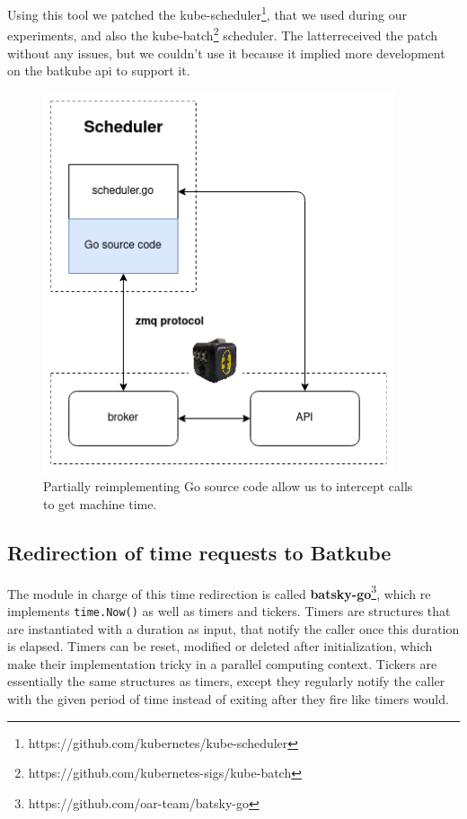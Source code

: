 Using this tool we patched the
kube-scheduler\footnote{https://github.com/kubernetes/kube-scheduler}, that we
used during our experiments, and also the
kube-batch\footnote{https://github.com/kubernetes-sigs/kube-batch} scheduler.
The latterreceived the patch without any issues, but we couldn't use it because
it implied more development on the batkube api to support it.

\begin{figure}[]
	\centering
	\includegraphics[scale=0.75]{imgs/time-hijack-Go.png}
	\caption{Partially reimplementing Go source code allow us to intercept calls to get machine time.}
	\label{fig:patch-time}
\end{figure}

\subsection{Redirection of time requests to Batkube}

The module in charge of this time redirection is called
\textbf{batsky-go}\footnote{https://github.com/oar-team/batsky-go}, which re
implements \texttt{time.Now()} as well as timers and tickers. Timers are
structures that are instantiated with a duration as input, that notify the
caller once this duration is elapsed. Timers can be reset, modified or deleted
after initialization, which make their implementation tricky in a parallel
computing context. Tickers are essentially the same structures as timers,
except they regularly notify the caller with the given period of time instead
of exiting after they fire like timers would.

